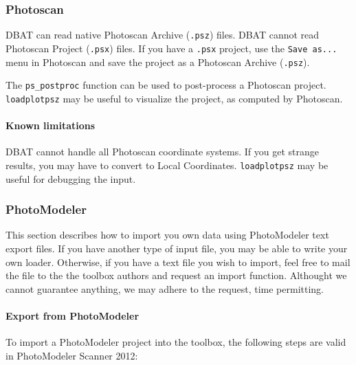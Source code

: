 \documentclass{article}
\begin{document}
\subsubsection{Photoscan}

DBAT can read native Photoscan Archive (\verb+.psz+) files. DBAT
cannot read Photoscan Project (\verb+.psx+) files. If you have a
\verb+.psx+ project, use the \verb+Save as...+ menu in
Photoscan and save the project as a Photoscan Archive (\verb+.psz+).

The \verb+ps_postproc+ function can be used to post-process a
Photoscan project. \verb+loadplotpsz+ may be useful to visualize the
project, as computed by Photoscan.

\paragraph{Known limitations}

DBAT cannot handle all Photoscan coordinate systems. If you get
strange results, you may have to convert to Local Coordinates. \verb+loadplotpsz+ may be useful for debugging the input.

\subsubsection{PhotoModeler}

This section describes how to import you own data using PhotoModeler
text export files. If you have another type of input file, you may be
able to write your own loader. Otherwise, if you have a text file you
wish to import, feel free to mail the file to the the toolbox authors
and request an import function. Althought we cannot guarantee
anything, we may adhere to the request, time permitting.

\paragraph{Export from PhotoModeler}

To import a PhotoModeler project into the toolbox, the following
steps are valid in PhotoModeler Scanner 2012:
\end{document}
